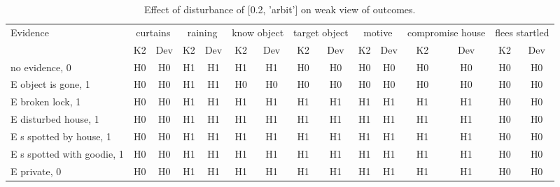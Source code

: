 \begin{table}\begin{tabular}{l|cc|cc|cc|cc|cc|cc|cc}\toprule\multirow{2}{*}{Evidence} & \multicolumn{2}{c}{curtains}& \multicolumn{2}{c}{raining}& \multicolumn{2}{c}{know object}& \multicolumn{2}{c}{target object}& \multicolumn{2}{c}{motive}& \multicolumn{2}{c}{compromise house}& \multicolumn{2}{c}{flees startled}\\& {K2} & {Dev}& {K2} & {Dev}& {K2} & {Dev}& {K2} & {Dev}& {K2} & {Dev}& {K2} & {Dev}& {K2} & {Dev}\\\midrule
no evidence, 0 & H0&H0&H1&H1&H1&H1&H0&H0&H0&H0&H0&H0&H0&H0\\E object is gone, 1 & H0&H0&H1&H1&H0&H0&H0&H0&H0&H0&H0&H0&H0&H0\\E broken lock, 1 & H0&H0&H1&H1&H1&H1&H1&H1&H1&H1&H1&H1&H0&H0\\E disturbed house, 1 & H0&H0&H1&H1&H1&H1&H1&H1&H1&H1&H1&H1&H0&H0\\E s spotted by house, 1 & H0&H0&H1&H1&H1&H1&H1&H1&H1&H1&H1&H1&H0&H0\\E s spotted with goodie, 1 & H0&H0&H1&H1&H1&H1&H1&H1&H1&H1&H1&H1&H0&H0\\E private, 0 & H0&H0&H1&H1&H1&H1&H1&H1&H1&H1&H1&H1&H0&H0\\\bottomrule\end{tabular}\caption{Effect of disturbance of [0.2, 'arbit'] on weak view of outcomes.}\end{table}